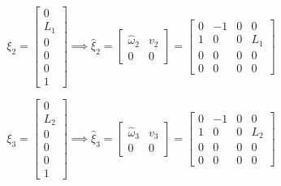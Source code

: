 \begin{equation*}
    \xi_{2}
    =
    \begin{bmatrix}
        0   \\
        L_1 \\
        0   \\
        0   \\
        0   \\
        1
    \end{bmatrix}
    \implies
    \widehat{\xi}_{2}
    =
    \begin{bmatrix}
        \widehat{\omega}_{2} & v_2 \\
        0                    & 0
    \end{bmatrix}
    =
    \begin{bmatrix}
        0 & -1 & 0 & 0   \\
        1 & 0  & 0 & L_1 \\
        0 & 0  & 0 & 0   \\
        0 & 0  & 0 & 0
    \end{bmatrix}
\end{equation*}

\begin{equation*}
    \xi_{3}
    =
    \begin{bmatrix}
        0   \\
        L_2 \\
        0   \\
        0   \\
        0   \\
        1
    \end{bmatrix}
    \implies
    \widehat{\xi}_{3}
    =
    \begin{bmatrix}
        \widehat{\omega}_{3} & v_3 \\
        0                    & 0
    \end{bmatrix}
    =
    \begin{bmatrix}
        0 & -1 & 0 & 0   \\
        1 & 0  & 0 & L_2 \\
        0 & 0  & 0 & 0   \\
        0 & 0  & 0 & 0
    \end{bmatrix}
\end{equation*}

